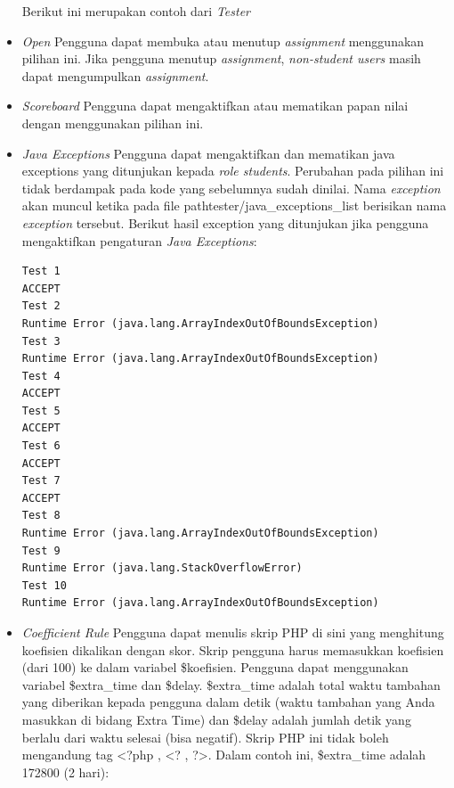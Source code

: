 \begin{itemize}
    Berikut ini merupakan contoh dari \textit{Tester}
    
    
        \item \textit{Open} \newline
        Pengguna dapat membuka atau menutup \textit{assignment} menggunakan pilihan ini. Jika pengguna menutup \textit{assignment}, \textit{non-student users} masih dapat mengumpulkan \textit{assignment}. \\
        \item \textit{Scoreboard} \newline
        Pengguna dapat mengaktifkan atau mematikan papan nilai dengan menggunakan pilihan ini.
        \item \textit{Java Exceptions} \newline
        Pengguna dapat mengaktifkan dan mematikan java exceptions yang ditunjukan kepada \textit{role students}. Perubahan pada pilihan ini tidak berdampak pada kode yang sebelumnya sudah dinilai. Nama \textit{exception} akan muncul ketika pada file pathtester/java\_exceptions\_list berisikan nama \textit{exception} tersebut. Berikut hasil exception yang ditunjukan jika pengguna mengaktifkan pengaturan \textit{Java Exceptions}:
        
         \begin{lstlisting}[basicstyle=\ttfamily, frame=single,
    columns=fullflexible, breaklines=true, numbers=none]
Test 1
ACCEPT
Test 2
Runtime Error (java.lang.ArrayIndexOutOfBoundsException)
Test 3
Runtime Error (java.lang.ArrayIndexOutOfBoundsException)
Test 4
ACCEPT
Test 5
ACCEPT
Test 6
ACCEPT
Test 7
ACCEPT
Test 8
Runtime Error (java.lang.ArrayIndexOutOfBoundsException)
Test 9
Runtime Error (java.lang.StackOverflowError)
Test 10
Runtime Error (java.lang.ArrayIndexOutOfBoundsException)
    \end{lstlisting}

        \item \textit{Coefficient Rule} \newline
        Pengguna dapat menulis skrip PHP di sini yang menghitung koefisien dikalikan dengan skor. Skrip pengguna harus memasukkan koefisien (dari 100) ke dalam variabel \$koefisien. Pengguna dapat menggunakan variabel \$extra\_time dan \$delay. \$extra\_time adalah total waktu tambahan yang diberikan kepada pengguna dalam detik (waktu tambahan yang Anda masukkan di bidang Extra Time) dan \$delay adalah jumlah detik yang berlalu dari waktu selesai (bisa negatif). Skrip PHP ini tidak boleh mengandung tag <?php , <? , ?>. Dalam contoh ini, \$extra\_time adalah 172800 (2 hari): 
        

\end{itemize}

